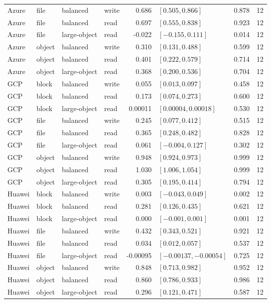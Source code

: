 \begin{tabular}{llllrlrr}
Azure & file & balanced & write & 0.686 & $[0.505, 0.866]$ & 0.878 & 12 \\
Azure & file & balanced & read & 0.697 & $[0.555, 0.838]$ & 0.923 & 12 \\
Azure & file & large-object & read & -0.022 & $[-0.155, 0.111]$ & 0.014 & 12 \\
Azure & object & balanced & write & 0.310 & $[0.131, 0.488]$ & 0.599 & 12 \\
Azure & object & balanced & read & 0.401 & $[0.222, 0.579]$ & 0.714 & 12 \\
Azure & object & large-object & read & 0.368 & $[0.200, 0.536]$ & 0.704 & 12 \\
GCP & block & balanced & write & 0.055 & $[0.013, 0.097]$ & 0.458 & 12 \\
GCP & block & balanced & read & 0.173 & $[0.074, 0.273]$ & 0.600 & 12 \\
GCP & block & large-object & read & 0.00011 & $[0.00004, 0.00018]$ & 0.530 & 12 \\
GCP & file & balanced & write & 0.245 & $[0.077, 0.412]$ & 0.515 & 12 \\
GCP & file & balanced & read & 0.365 & $[0.248, 0.482]$ & 0.828 & 12 \\
GCP & file & large-object & read & 0.061 & $[-0.004, 0.127]$ & 0.302 & 12 \\
GCP & object & balanced & write & 0.948 & $[0.924, 0.973]$ & 0.999 & 12 \\
GCP & object & balanced & read & 1.030 & $[1.006, 1.054]$ & 0.999 & 12 \\
GCP & object & large-object & read & 0.305 & $[0.195, 0.414]$ & 0.794 & 12 \\
Huawei & block & balanced & write & 0.003 & $[-0.043, 0.049]$ & 0.002 & 12 \\
Huawei & block & balanced & read & 0.281 & $[0.126, 0.435]$ & 0.621 & 12 \\
Huawei & block & large-object & read & 0.000 & $[-0.001, 0.001]$ & 0.001 & 12 \\
Huawei & file & balanced & write & 0.432 & $[0.343, 0.521]$ & 0.921 & 12 \\
Huawei & file & balanced & read & 0.034 & $[0.012, 0.057]$ & 0.537 & 12 \\
Huawei & file & large-object & read & -0.00095 & $[-0.00137, -0.00054]$ & 0.725 & 12 \\
Huawei & object & balanced & write & 0.848 & $[0.713, 0.982]$ & 0.952 & 12 \\
Huawei & object & balanced & read & 0.860 & $[0.786, 0.933]$ & 0.986 & 12 \\
Huawei & object & large-object & read & 0.296 & $[0.121, 0.471]$ & 0.587 & 12 \\
\bottomrule
\end{tabular}
